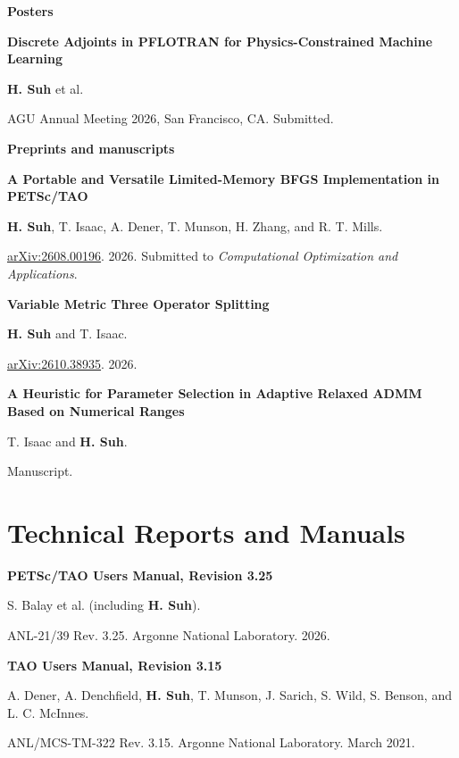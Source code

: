 \documentclass[10pt,letterpaper]{article}
\newcommand{\paper}[3]{\par\textbf{#1}\par #2\par #3\par}
\begin{document}
\textbf{Posters}
\paper{Discrete Adjoints in PFLOTRAN for Physics-Constrained Machine Learning}
{\textbf{H. Suh} et al.}
{AGU Annual Meeting 2026, San Francisco, CA. Submitted.}

\textbf{Preprints and manuscripts}
\paper{A Portable and Versatile Limited-Memory BFGS Implementation in PETSc/TAO}
{\textbf{H. Suh}, T. Isaac, A. Dener, T. Munson, H. Zhang, and R. T. Mills.}
{\href{https://arxiv.org/abs/2608.00196}{arXiv:2608.00196}. 2026. Submitted to \emph{Computational Optimization and Applications}.}
\paper{Variable Metric Three Operator Splitting}{\textbf{H. Suh} and T. Isaac.}
{\href{https://arxiv.org/abs/2610.38935}{arXiv:2610.38935}. 2026.}
\paper{A Heuristic for Parameter Selection in Adaptive Relaxed ADMM Based on Numerical Ranges}
{T. Isaac and \textbf{H. Suh}.}{Manuscript.}

\newpage
\section{Technical Reports and Manuals}
\paper{PETSc/TAO Users Manual, Revision 3.25}
{S. Balay et al. (including \textbf{H. Suh}).}
{ANL-21/39 Rev. 3.25. Argonne National Laboratory. 2026.}
\paper{TAO Users Manual, Revision 3.15}
{A. Dener, A. Denchfield, \textbf{H. Suh}, T. Munson, J. Sarich, S. Wild, S. Benson, and L. C. McInnes.}
{ANL/MCS-TM-322 Rev. 3.15. Argonne National Laboratory. March 2021.}
\end{document}
